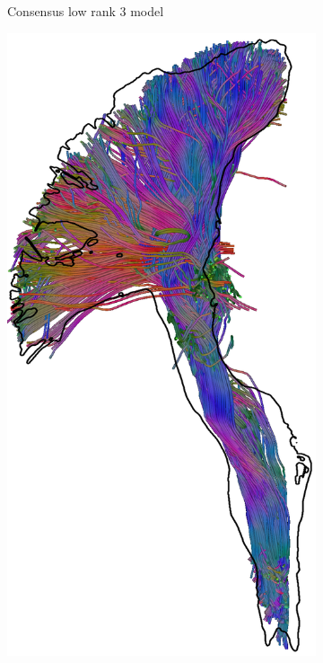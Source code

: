 \begin{figure}[t]
\begin{minipage}{0.19\linewidth}
\begin{subfigure}[b]{\linewidth}
		\caption{Consensus low rank 3 model}
\end{subfigure} 
	\end{minipage} \hfil
	\begin{minipage}{0.19\linewidth}
	\begin{subfigure}[b]{\linewidth}
		\includegraphics[width=\linewidth]{cst-avg-c}

\end{subfigure}
\end{minipage}
\end{figure}
